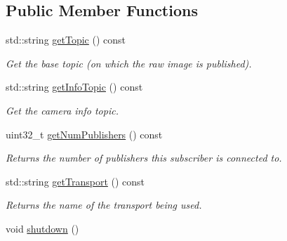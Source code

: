 \subsection*{Public Member Functions}
\begin{DoxyCompactItemize}
\item 
\hypertarget{classimage__transport_1_1_camera_subscriber_a52e7e96c56a813de43e9018cdd4640d4}{std\-::string \hyperlink{classimage__transport_1_1_camera_subscriber_a52e7e96c56a813de43e9018cdd4640d4}{get\-Topic} () const }\label{classimage__transport_1_1_camera_subscriber_a52e7e96c56a813de43e9018cdd4640d4}

\begin{DoxyCompactList}\small\item\em Get the base topic (on which the raw image is published). \end{DoxyCompactList}\item 
\hypertarget{classimage__transport_1_1_camera_subscriber_a427737122aa2fa743523aef215f95dfe}{std\-::string \hyperlink{classimage__transport_1_1_camera_subscriber_a427737122aa2fa743523aef215f95dfe}{get\-Info\-Topic} () const }\label{classimage__transport_1_1_camera_subscriber_a427737122aa2fa743523aef215f95dfe}

\begin{DoxyCompactList}\small\item\em Get the camera info topic. \end{DoxyCompactList}\item 
uint32\-\_\-t \hyperlink{classimage__transport_1_1_camera_subscriber_a5dca2655dfe5c885ff992693084530b0}{get\-Num\-Publishers} () const 
\begin{DoxyCompactList}\small\item\em Returns the number of publishers this subscriber is connected to. \end{DoxyCompactList}\item 
\hypertarget{classimage__transport_1_1_camera_subscriber_a31dd4cfcdaaf14d304624d78bcdf4a87}{std\-::string \hyperlink{classimage__transport_1_1_camera_subscriber_a31dd4cfcdaaf14d304624d78bcdf4a87}{get\-Transport} () const }\label{classimage__transport_1_1_camera_subscriber_a31dd4cfcdaaf14d304624d78bcdf4a87}

\begin{DoxyCompactList}\small\item\em Returns the name of the transport being used. \end{DoxyCompactList}\item 
\hypertarget{classimage__transport_1_1_camera_subscriber_aa42ceb9613a14d4c2e297674e52ee684}{void \hyperlink{classimage__transport_1_1_camera_subscriber_aa42ceb9613a14d4c2e297674e52ee684}{shutdown} ()}\label{classimage__transport_1_1_camera_subscriber_aa42ceb9613a14d4c2e297674e52ee684}


\end{DoxyCompactItemize}
